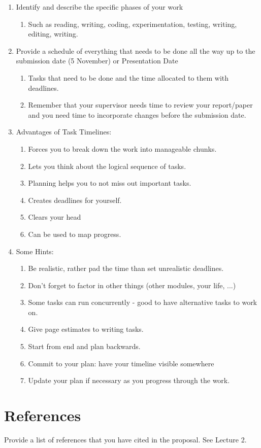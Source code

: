 \documentclass[runningheads,a4paper]{llncs}
\begin{document}
\begin{enumerate}

 \item Identify and describe the specific phases of your work
 \begin{enumerate}
  \item Such as reading, writing, coding, experimentation, testing, writing, editing, writing.
 \end{enumerate}
 
 \item Provide a schedule of everything that needs to be done all the way up to the submission date (5 November) or Presentation Date
 \begin{enumerate}
  \item Tasks that need to be done and the time allocated to them with deadlines.
  \item Remember that your supervisor needs time to review your report/paper and you need time to incorporate changes before the submission date.
 \end{enumerate}
 
 \item Advantages of Task Timelines:
 \begin{enumerate}
  \item Forces you to break down the work into manageable chunks.
  \item Lets you think about the logical sequence of tasks.
  \item Planning helps you to not miss out important tasks.
  \item Creates deadlines for yourself.
  \item Clears your head
  \item Can be used to map progress.
 \end{enumerate}
 
 \item Some Hints:
 \begin{enumerate}
  \item Be realistic, rather pad the time than set unrealistic deadlines.
  \item Don't forget to factor in other things (other modules, your life, ...)
  \item Some tasks can run concurrently - good to have alternative tasks to work on.
  \item Give page estimates to writing tasks.
  \item Start from end and plan backwards.
  \item Commit to your plan: have your timeline visible somewhere
  \item Update your plan if necessary as you progress through the work.
 \end{enumerate}

\end{enumerate}

\section{References}\label{references}

Provide a list of references that you have cited in the proposal. See Lecture 2.\\



\end{document}
